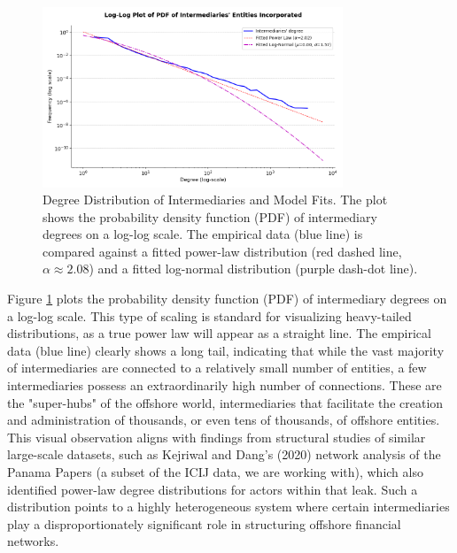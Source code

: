 \begin{figure}[htbp]
    \centering
    \includegraphics[width=0.8\textwidth]{images/Preliminary_Powerlaw_Fit.png} %
    \caption{Degree Distribution of Intermediaries and Model Fits. The plot shows the probability density function (PDF) of intermediary degrees on a log-log scale. The empirical data (blue line) is compared against a fitted power-law distribution (red dashed line, $\alpha \approx 2.08$) and a fitted log-normal distribution (purple dash-dot line).}
    \label{fig:preliminary_powerlaw_fit}
\end{figure}
Figure \ref{fig:preliminary_powerlaw_fit} plots the probability density function (PDF) of intermediary degrees on a log-log scale. This type of scaling is standard for visualizing heavy-tailed distributions, as a true power law will appear as a straight line. The empirical data (blue line) clearly shows a long tail, indicating that while the vast majority of intermediaries are connected to a relatively small number of entities, a few intermediaries possess an extraordinarily high number of connections. These are the "super-hubs" of the offshore world, intermediaries that facilitate the creation and administration of thousands, or even tens of thousands, of offshore entities. This visual observation aligns with findings from structural studies of similar large-scale datasets, such as Kejriwal and Dang's (2020) network analysis of the Panama Papers (a subset of the ICIJ data, we are working with), which also identified power-law degree distributions for actors within that leak. Such a distribution points to a highly heterogeneous system where certain intermediaries play a disproportionately significant role in structuring offshore financial networks.

